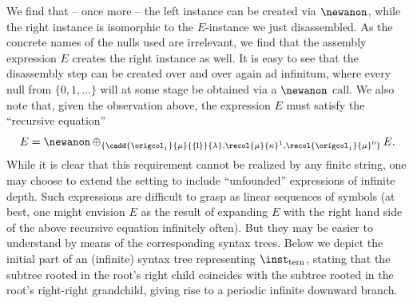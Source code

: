 \begin{example}
\noindent We find that -- once more -- the left instance can be created via $\newanon$, while the right instance is isomorphic to the $E$-instance we just disassembled. As the concrete names of the nulls used are irrelevant, we find that the assembly expression $E$ creates the right instance as well. It is easy to see that the disassembly step can be created over and over again ad infinitum, where every null from $\{0,1,\ldots\}$ will at some stage be obtained via a $\newanon$ call. We also note that, given the observation above, the expression $E$ must satisfy the ``recursive equation'' $$E = \newanon \,\smash{\oplus_{\{\cadd{\origcol_1}{\mu}{\smash{\{\hspace{-1pt}1\hspace{-1pt}\}}}{\lambda},\recol{\mu}{\kappa}^1,\recol{\origcol_{1}}{\mu}^0\}}}\,E.$$
While it is clear that this requirement cannot be realized by any finite string, one may choose to extend the setting to include ``unfounded'' expressions of infinite depth. Such expressions are difficult to grasp as linear sequences of symbols (at best, one might envision $E$ as the result of expanding $E$ with the right hand side of the above recursive equation infinitely often). But they may be easier to understand by means of the corresponding syntax trees. Below we depict the initial part of an (infinite) syntax tree representing $\inst_\mathrm{tern}$, stating that the subtree rooted in the root's right child coincides with the subtree rooted in the root's right-right grandchild, giving rise to a periodic infinite downward branch. 

\hspace{15ex}
\end{example}
